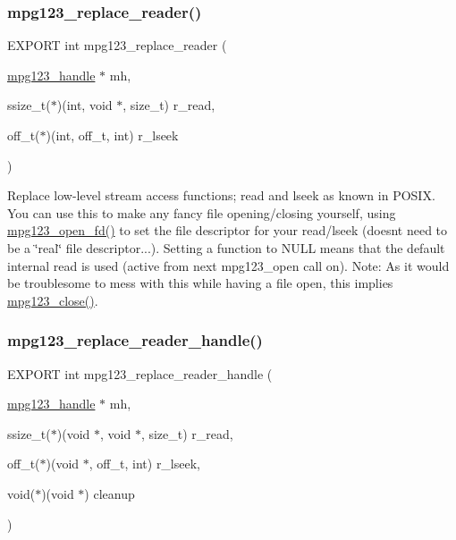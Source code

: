 \subsubsection{\texorpdfstring{mpg123\+\_\+replace\+\_\+reader()}{mpg123\_replace\_reader()}}
{\footnotesize\ttfamily E\+X\+P\+O\+RT int mpg123\+\_\+replace\+\_\+reader (\begin{DoxyParamCaption}\item[{\hyperlink{group__mpg123__init_ga6728e2839a395f3a07d4514da659faca}{mpg123\+\_\+handle} $\ast$}]{mh,  }\item[{ssize\+\_\+t($\ast$)(int, void $\ast$, size\+\_\+t)}]{r\+\_\+read,  }\item[{off\+\_\+t($\ast$)(int, off\+\_\+t, int)}]{r\+\_\+lseek }\end{DoxyParamCaption})}

Replace low-\/level stream access functions; read and lseek as known in P\+O\+S\+IX. You can use this to make any fancy file opening/closing yourself, using \hyperlink{group__mpg123__input_gaf205cf0e2c2a6612f564b17d50d227f4}{mpg123\+\_\+open\+\_\+fd()} to set the file descriptor for your read/lseek (doesn\textquotesingle{}t need to be a \char`\"{}real\char`\"{} file descriptor...). Setting a function to N\+U\+LL means that the default internal read is used (active from next mpg123\+\_\+open call on). Note\+: As it would be troublesome to mess with this while having a file open, this implies \hyperlink{group__mpg123__input_ga1c86c6042807ab7734b67a829ee7a2e7}{mpg123\+\_\+close()}. \mbox{\label{group__mpg123__lowio_gacce158687fce659acb242952b0a30916}} 
\subsubsection{\texorpdfstring{mpg123\+\_\+replace\+\_\+reader\+\_\+handle()}{mpg123\_replace\_reader\_handle()}}
{\footnotesize\ttfamily E\+X\+P\+O\+RT int mpg123\+\_\+replace\+\_\+reader\+\_\+handle (\begin{DoxyParamCaption}\item[{\hyperlink{group__mpg123__init_ga6728e2839a395f3a07d4514da659faca}{mpg123\+\_\+handle} $\ast$}]{mh,  }\item[{ssize\+\_\+t($\ast$)(void $\ast$, void $\ast$, size\+\_\+t)}]{r\+\_\+read,  }\item[{off\+\_\+t($\ast$)(void $\ast$, off\+\_\+t, int)}]{r\+\_\+lseek,  }\item[{void($\ast$)(void $\ast$)}]{cleanup }\end{DoxyParamCaption})}


